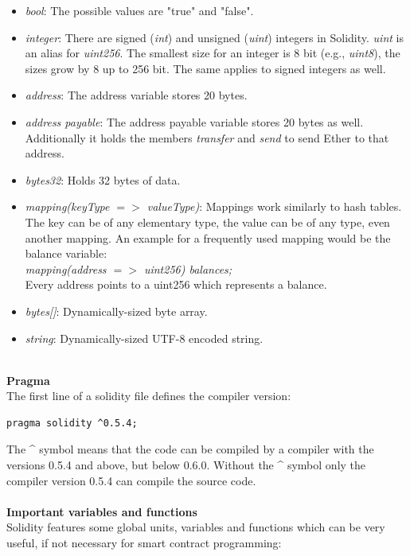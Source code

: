 \begin{itemize}
  \item \textit{bool}: The possible values are "true" and "false".
  \item \textit{integer}: There are signed (\textit{int}) and unsigned (\textit{uint}) integers in Solidity.
  \textit{uint} is an alias for \textit{uint256}.
  The smallest size for an integer is 8 bit (e.g., \textit{uint8}), the sizes grow by 8 up to 256 bit.
  The same applies to signed integers as well.
  \item \textit{address}: The address variable stores 20 bytes.
  \item \textit{address payable}: The address payable variable stores 20 bytes as well.
  Additionally it holds the members \textit{transfer} and \textit{send} to send Ether to that address.
  \item \textit{bytes32}: Holds 32 bytes of data.
  \item \textit{mapping(keyType $=>$ valueType)}: Mappings work similarly to hash tables.
  The key can be of any elementary type, the value can be of any type, even another mapping.
  An example for a frequently used mapping would be the balance variable:
  \\
  \textit{mapping(address $=>$ uint256) balances;}
  \\
  Every address points to a uint256 which represents a balance.
  \item \textit{bytes[]}: Dynamically-sized byte array.
  \item \textit{string}: Dynamically-sized UTF-8 encoded string.
\end{itemize}
\leavevmode
\\
\textbf{Pragma}\\
The first line of a solidity file defines the compiler version\cite{doc-pragma}:
\begin{lstlisting}[language=Solidity, numbers=none]
  pragma solidity ^0.5.4;
\end{lstlisting}
The \^{} symbol means that the code can be compiled by a compiler with the versions 0.5.4 and above, but below 0.6.0. Without the \^{} symbol only the compiler version 0.5.4 can compile the source code.
\\\\
\textbf{Important variables and functions}\\
Solidity features some global units, variables and functions which can be very useful, if not necessary for smart contract programming:
